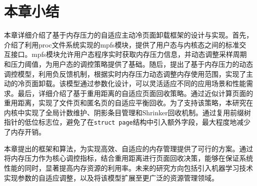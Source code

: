 \section{本章小结}
\label{sec:本章小结}

本章详细介绍了基于内存压力的自适应主动冷页面卸载框架的设计与实现。首先，介绍了利用proc文件系统实现的mpfs模块，提供了用户态与内核态之间的标准交互接口。mpfs模块允许用户态程序实时获取内存压力信息，并动态调整采样周期和压力阈值，为用户态的调控策略提供了基础。随后，提出了基于内存压力的动态调控模型，利用负反馈机制，根据实时内存压力动态调整内存使用范围，实现了主动的冷页面卸载。该模型通过参数化设计，可以灵活适应不同的应用场景和性能需求。最后，详细介绍了基于重用距离的自适应页面回收策略。通过近似计算页面的重用距离，实现了文件页和匿名页的自适应平衡回收。为了支持该策略，本研究在内核中实现了全局计数维护、阴影条目管理和Shrinker回收机制。通过复用前缀树指针的低位标志位，避免了在\texttt{struct page}结构中引入额外字段，最大程度地减少了内存开销。

本章提出的框架和算法，为实现高效、自适应的内存管理提供了可行的方案。通过将内存压力作为核心调控指标，结合重用距离进行页面回收决策，能够在保证系统性能的同时，显著提高内存资源的利用率。未来的研究方向包括引入机器学习技术实现参数的自适应调整，以及将该模型扩展至更广泛的资源管理领域。
